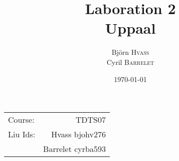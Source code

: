 \documentclass{article}
\title{Laboration 2 \\ Uppaal} %
\author{
  Björn \textsc{Hvass}\\
  Cyril \textsc{Barrelet}
} %
\date{\today} %
\begin{document}
\maketitle %

\begin{center}
\begin{tabular}{l r}
Course: & TDTS07\\ %
Liu Ids: & Hvass bjohv276\\ %
& Barrelet cyrba593 \\
\end{tabular}
\end{center}

\newpage
\newpage
\newpage
\newpage
\newpage
\newpage






\end{document}
